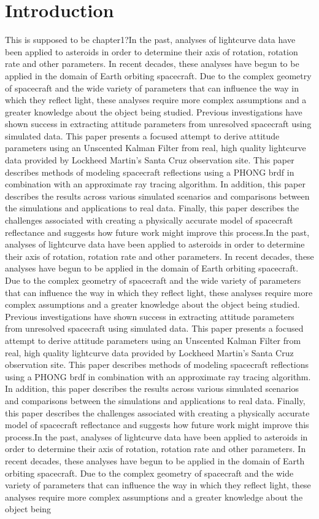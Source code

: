\chapter*{Introduction}
This is supposed to be chapter1?In the past, analyses of lightcurve data have been applied to asteroids in order to determine their axis of rotation, rotation rate and other parameters. In recent decades, these analyses have begun to be applied in the domain of Earth orbiting spacecraft. Due to the complex geometry of spacecraft and the wide variety of parameters that can influence the way in which they reflect light, these analyses require more complex assumptions and a greater knowledge about the object being studied. Previous investigations have shown success in extracting attitude parameters from unresolved spacecraft using simulated data. This paper presents a focused attempt to derive attitude parameters using an Unscented Kalman Filter from real, high quality lightcurve data provided by Lockheed Martin's Santa Cruz observation site. This paper describes methods of modeling spacecraft reflections using a PHONG brdf in combination with an approximate ray tracing algorithm. In addition, this paper describes the results across various simulated scenarios and comparisons between the simulations and applications to real data. Finally, this paper describes the challenges associated with creating a physically accurate model of spacecraft reflectance and suggests how future work might improve this process.In the past, analyses of lightcurve data have been applied to asteroids in order to determine their axis of rotation, rotation rate and other parameters. In recent decades, these analyses have begun to be applied in the domain of Earth orbiting spacecraft. Due to the complex geometry of spacecraft and the wide variety of parameters that can influence the way in which they reflect light, these analyses require more complex assumptions and a greater knowledge about the object being studied. Previous investigations have shown success in extracting attitude parameters from unresolved spacecraft using simulated data. This paper presents a focused attempt to derive attitude parameters using an Unscented Kalman Filter from real, high quality lightcurve data provided by Lockheed Martin's Santa Cruz observation site. This paper describes methods of modeling spacecraft reflections using a PHONG brdf in combination with an approximate ray tracing algorithm. In addition, this paper describes the results across various simulated scenarios and comparisons between the simulations and applications to real data. Finally, this paper describes the challenges associated with creating a physically accurate model of spacecraft reflectance and suggests how future work might improve this process.In the past, analyses of lightcurve data have been applied to asteroids in order to determine their axis of rotation, rotation rate and other parameters. In recent decades, these analyses have begun to be applied in the domain of Earth orbiting spacecraft. Due to the complex geometry of spacecraft and the wide variety of parameters that can influence the way in which they reflect light, these analyses require more complex assumptions and a greater knowledge about the object being 